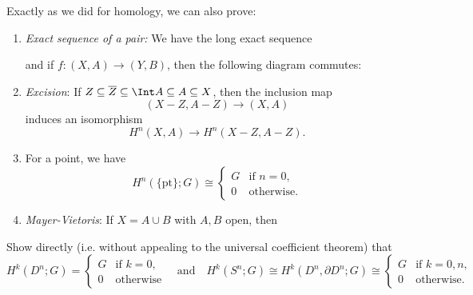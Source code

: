 \begin{remark}
  Exactly as we did for homology, we can also prove:
  \begin{enumerate}
    \item \emph{Exact sequence of a pair:}
      We have the long exact sequence
      \begin{center}
      \end{center}
      and if $f : (X, A) \to (Y, B)$, then
      the following diagram commutes:
      \begin{center}
      \end{center}
    \item \emph{Excision}: If
      $Z \subseteq \overline{Z} \subseteq \Int A \subseteq A \subseteq X$, then
      the inclusion map
      \[
        (X - Z, A - Z) \longrightarrow (X, A)
      \]
      induces an isomorphism
      \[
        H^n(X, A) \longrightarrow H^n(X - Z, A - Z).
      \]
    \item For a point, we have
      \[
        H^n(\{\mathrm{pt}\}; G)
        \cong
        \begin{cases}
          G & \text{if } n = 0, \\
          0 & \text{otherwise}.
        \end{cases}
      \]
    \item \emph{Mayer-Vietoris}: If
      $X = A \cup B$ with $A, B$ open, then
      \begin{center}
      \end{center}
  \end{enumerate}
\end{remark}

\begin{exercise}
  Show directly (i.e. without appealing to the
  universal coefficient theorem) that
  \[
    H^k(D^n; G) =
    \begin{cases}
      G & \text{if } k = 0, \\
      0 & \text{otherwise}
    \end{cases}
    \quad \text{and} \quad
    H^k(S^n; G)
    \cong H^k(D^n, \partial D^n; G)
    \cong
    \begin{cases}
      G & \text{if } k = 0, n, \\
      0 & \text{otherwise}.
    \end{cases}
  \]
\end{exercise}

